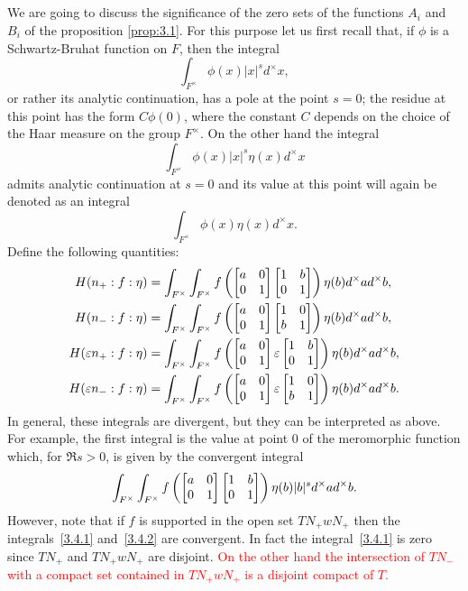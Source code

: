 \subsection{}
We are going to discuss the significance of the zero sets of the  functions $A_i$ and $B_i$ of the proposition \ref{prop:3.1}.
For this purpose let us first recall that, if $\phi$ is a Schwartz-Bruhat function on $F$, then the integral
\[
\int_{F^\times} \phi(x) |x|^{s} d^\times x,
\]
or rather its analytic continuation, has a pole at the point $s = 0$; the residue at this point has the form $C\phi(0)$, where the constant $C$ depends on the choice of the Haar measure on the group $F^\times$.
On the other hand the integral
\[
\int_{F^\times} \phi(x) |x|^{s} \eta(x) d^\times x
\]
admits analytic continuation at $s = 0$ and its value at this point will again be denoted as an integral
\[
\int_{F^\times} \phi(x) \eta(x) d^\times x.
\]
Define the following quantities:
\begin{align}
    H(n_+: f: \eta) &= \int_{F^\times}\int_{F^\times} f \left( \begin{bmatrix} a & 0 \\ 0 & 1 \end{bmatrix} \begin{bmatrix} 1 & b \\ 0 & 1 \end{bmatrix} \right) \eta(b) d^\times a d^\times b, \label{3.4.1} \\
    H(n_-: f: \eta) &= \int_{F^\times}\int_{F^\times} f \left( \begin{bmatrix} a & 0 \\ 0 & 1 \end{bmatrix} \begin{bmatrix} 1 & 0 \\ b & 1 \end{bmatrix} \right) \eta(b) d^\times a d^\times b, \label{3.4.2} \\
    H(\varepsilon n_+: f: \eta) &= \int_{F^\times}\int_{F^\times} f \left( \begin{bmatrix} a & 0 \\ 0 & 1 \end{bmatrix} \varepsilon \begin{bmatrix} 1 & b \\ 0 & 1 \end{bmatrix} \right) \eta(b) d^\times a d^\times b, \label{3.4.3} \\
    H(\varepsilon n_-: f: \eta) &= \int_{F^\times}\int_{F^\times} f \left( \begin{bmatrix} a & 0 \\ 0 & 1 \end{bmatrix} \varepsilon \begin{bmatrix} 1 & 0 \\ b & 1 \end{bmatrix} \right) \eta(b) d^\times a d^\times b. \label{3.4.4}
\end{align}
In general, these integrals are divergent, but they can be interpreted as above.
For example, the first integral is the value at point 0 of the meromorphic function which, for $\Re s > 0$, is given by the convergent integral
\begin{align}
    \int_{F^\times} \int_{F^\times} f\left( \begin{bmatrix} a & 0 \\ 0 & 1 \end{bmatrix} \begin{bmatrix} 1 & b \\ 0 & 1 \end{bmatrix} \right) \eta(b) |b|^{s} d^\times a d^\times b.
\end{align}
However, note that if $f$ is supported in the open set $TN_{+}wN_{+}$ then the integrals~\eqref{3.4.1} and~\eqref{3.4.2} are convergent.
In fact the integral~\eqref{3.4.1} is zero since $TN_{+}$ and $TN_{+}wN_{+}$ are disjoint.
\textcolor{red}{On the other hand the intersection of $TN_{-}$ with a compact set contained in $TN_{+}wN_{+}$ is a disjoint compact of $T$.}
